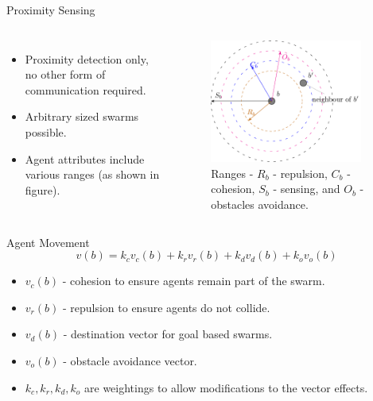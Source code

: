 \documentclass{beamer}
\begin{document}
\begin{frame}{Proximity Sensing}
  \begin{columns}
    \begin{itemize}
      \item {
        Proximity detection only, no other form of communication required.
      }
      \item {   
        Arbitrary sized swarms possible.
      }
      \item {   
        Agent attributes include various ranges (as shown in figure).
      }
    \end{itemize}
      \begin{figure}
        \begin{center}
        \includegraphics[width=5cm]{Proximity.pdf}
        \end{center}
        \caption{Ranges - $R_b$ - repulsion, $C_b$ - cohesion, $S_b$ - sensing, and $O_b$ - obstacles avoidance.}
      \end{figure}
  \end{columns} 
\end{frame}

\begin{frame}{Agent Movement}
  \begin{equation}\label{eq:BotPhysics1}
    v(b) = k_cv_c(b) + k_rv_r(b) + k_dv_d(b) + k_ov_o(b)
  \end{equation}
  \begin{itemize}
    \item $v_c(b)$ - cohesion to ensure agents remain part of the swarm.
    \item $v_r(b)$ - repulsion to ensure agents do not collide.
    \item $v_d(b)$ - destination vector for goal based swarms.
    \item $v_o(b)$ - obstacle avoidance vector.
    \item $k_c, k_r, k_d, k_o$ are weightings to allow modifications to the vector effects. 
  \end{itemize}
  
\end{frame}
\end{document}
